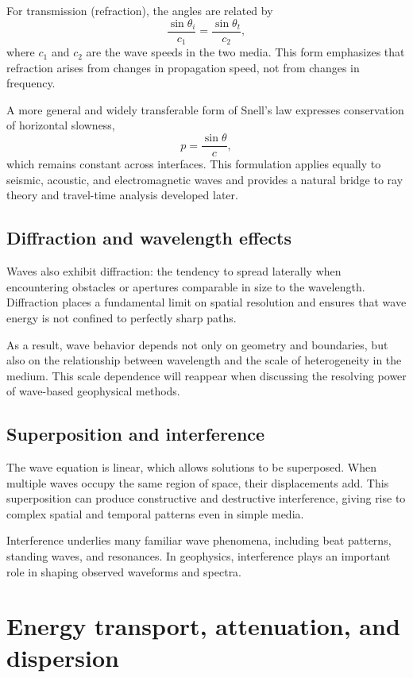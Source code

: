 For transmission (refraction), the angles are related by
\[
    \frac{\sin \theta_i}{c_1} = \frac{\sin \theta_t}{c_2},
\]
where $c_1$ and $c_2$ are the wave speeds in the two media. This form emphasizes that refraction arises from changes in propagation speed, not from changes in frequency.

A more general and widely transferable form of Snell's law expresses conservation of horizontal slowness,
\[
p = \frac{\sin \theta}{c},
\]
which remains constant across interfaces. This formulation applies equally to seismic, acoustic, and electromagnetic waves and provides a natural bridge to ray theory and travel-time analysis developed later.

\subsection{Diffraction and wavelength effects}

Waves also exhibit diffraction: the tendency to spread laterally when encountering obstacles or apertures comparable in size to the wavelength. Diffraction places a fundamental limit on spatial resolution and ensures that wave energy is not confined to perfectly sharp paths.

As a result, wave behavior depends not only on geometry and boundaries, but also on the relationship between wavelength and the scale of heterogeneity in the medium.  This scale dependence will reappear when discussing the resolving power of wave-based geophysical methods.

\subsection{Superposition and interference}

The wave equation is linear, which allows solutions to be superposed. When multiple waves occupy the same region of space, their displacements add. This superposition can produce constructive and destructive interference, giving rise to complex spatial and temporal patterns even in simple media.

Interference underlies many familiar wave phenomena, including beat patterns, standing waves, and resonances. In geophysics, interference plays an important role in shaping observed waveforms and spectra.


\section{Energy transport, attenuation, and dispersion}

